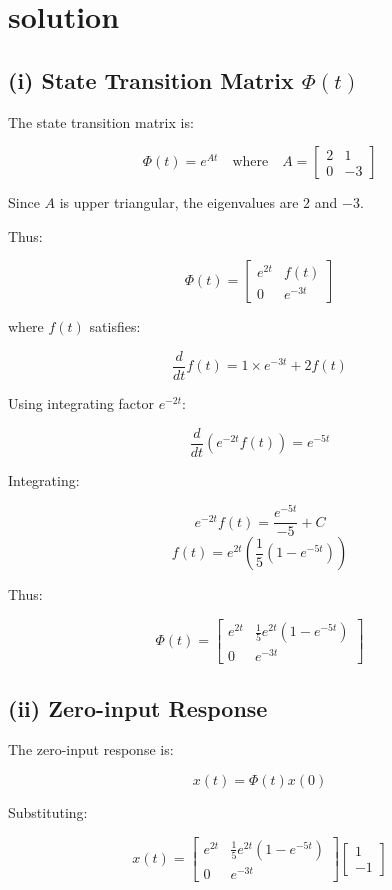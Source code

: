 \documentclass[12pt]{article}
\begin{document}
	\section*{solution}
	
	\subsection*{(i) State Transition Matrix \(\Phi(t)\)}
	
	The state transition matrix is:
	
	\[
	\Phi(t) = e^{At}
	\quad \text{where} \quad A = 
	\begin{bmatrix}
		2 & 1 \\ 
		0 & -3
	\end{bmatrix}
	\]
	
	Since \(A\) is upper triangular, the eigenvalues are \(2\) and \(-3\).
	
	Thus:
	
	\[
	\Phi(t) = 
	\begin{bmatrix}
		e^{2t} & f(t) \\ 
		0 & e^{-3t}
	\end{bmatrix}
	\]
	
	where \(f(t)\) satisfies:
	
	\[
	\frac{d}{dt} f(t) = 1 \times e^{-3t} + 2f(t)
	\]
	
	Using integrating factor \(e^{-2t}\):
	
	\[
	\frac{d}{dt}\left( e^{-2t} f(t) \right) = e^{-5t}
	\]
	
	Integrating:
	
	\[
	e^{-2t} f(t) = \frac{e^{-5t}}{-5} + C
	\]
	\[
	f(t) = e^{2t} \left( \frac{1}{5}(1 - e^{-5t}) \right)
	\]
	
	Thus:
	
	\[
	\boxed{
		\Phi(t) = 
		\begin{bmatrix}
			e^{2t} & \frac{1}{5}e^{2t}(1 - e^{-5t}) \\ 
			0 & e^{-3t}
		\end{bmatrix}
	}
	\]
	
	\subsection*{(ii) Zero-input Response}
	
	The zero-input response is:
	
	\[
	x(t) = \Phi(t) x(0)
	\]
	
	Substituting:
	
	\[
	x(t) = 
	\begin{bmatrix}
		e^{2t} & \frac{1}{5}e^{2t}(1 - e^{-5t}) \\ 
		0 & e^{-3t}
	\end{bmatrix}
	\begin{bmatrix}
		1 \\ -1
	\end{bmatrix}
	\]
	
\end{document}
